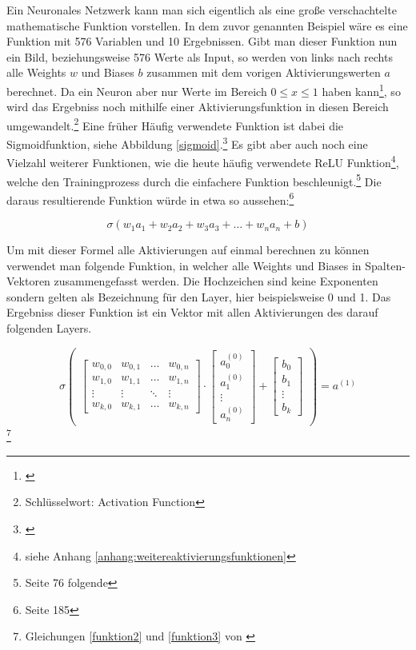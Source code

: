 Ein Neuronales Netzwerk kann man sich eigentlich als eine große verschachtelte mathematische Funktion vorstellen. In dem zuvor genannten Beispiel wäre es eine Funktion mit 576 Variablen und 10 Ergebnissen. Gibt man dieser Funktion nun ein Bild, beziehungsweise 576 Werte als Input, so werden von links nach rechts alle Weights $w$ und Biases $b$ zusammen mit dem vorigen Aktivierungswerten $a$ berechnet. Da ein Neuron aber nur Werte im Bereich $0\leq x \leq 1$ haben kann\footnote{\cite{3blue1brown}}, so wird das Ergebniss noch mithilfe einer Aktivierungsfunktion in diesen Bereich umgewandelt.\footnote{\cite{googleMlGlossar} Schlüsselwort: Activation Function} Eine früher Häufig verwendete Funktion ist dabei die Sigmoidfunktion, siehe Abbildung \ref{sigmoid}.\footnote{\cite{3blue1brown}} Es gibt aber auch noch eine Vielzahl weiterer Funktionen, wie die heute häufig verwendete ReLU Funktion\footnote{siehe Anhang \ref{anhang:weitereaktivierungsfunktionen}}, welche den Trainingprozess durch die einfachere Funktion beschleunigt.\footnote{\cite{nnfs} Seite 76 folgende} Die daraus resultierende Funktion würde in etwa so aussehen:\footnote{\cite{nnfs} Seite 185}

\begin{equation}\label{funktion1}
    \sigma(w_1a_1+w_2a_2+w_3a_3+ \ldots +w_na_n+b)
\end{equation}

Um mit dieser Formel alle Aktivierungen auf einmal berechnen zu können verwendet man folgende Funktion, in welcher alle Weights und Biases in Spalten-Vektoren zusammengefasst werden. Die Hochzeichen sind keine Exponenten sondern gelten als Bezeichnung für den Layer, hier beispielsweise 0 und 1. Das Ergebniss dieser Funktion ist ein Vektor mit allen Aktivierungen des darauf folgenden Layers.

\begin{equation}\label{funktion2}
    \sigma
    \begin{pmatrix}
        \begin{bmatrix}
            w_{0,0} & w_{0,1} & \ldots & w_{0,n} \\
            w_{1,0} & w_{1,1} & \ldots & w_{1,n} \\
            \vdots  & \vdots  & \ddots & \vdots  \\
            w_{k,0} & w_{k,1} & \ldots & w_{k,n}
        \end{bmatrix}
        \cdot
        \begin{bmatrix}
            a_0^{(0)} \\a_1^{(0)}\\\vdots\\a_n^{(0)}
        \end{bmatrix}
        +
        \begin{bmatrix}
            b_0 \\b_1\\\vdots\\b_k
        \end{bmatrix}
    \end{pmatrix}
    =
    a^{(1)}
\end{equation}\footnote{Gleichungen \ref{funktion2} und \ref{funktion3} von \cite{3blue1brown}}

